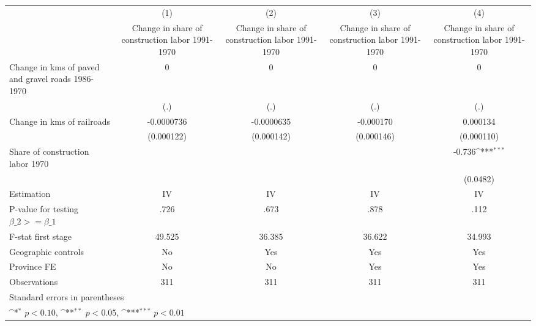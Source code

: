 {
\def\sym#1{\ifmmode^{#1}\else\(^{#1}\)\fi}
\begin{tabular}{l*{4}{c}}
\hline\hline
                    &\multicolumn{1}{c}{(1)}&\multicolumn{1}{c}{(2)}&\multicolumn{1}{c}{(3)}&\multicolumn{1}{c}{(4)}\\
                    &\multicolumn{1}{c}{Change in share of construction labor 1991-1970}&\multicolumn{1}{c}{Change in share of construction labor 1991-1970}&\multicolumn{1}{c}{Change in share of construction labor 1991-1970}&\multicolumn{1}{c}{Change in share of construction labor 1991-1970}\\
\hline
Change in kms of paved and gravel roads 1986-1970&           0         &           0         &           0         &           0         \\
                    &         (.)         &         (.)         &         (.)         &         (.)         \\
[1em]
Change in kms of railroads&  -0.0000736         &  -0.0000635         &   -0.000170         &    0.000134         \\
                    &  (0.000122)         &  (0.000142)         &  (0.000146)         &  (0.000110)         \\
[1em]
Share of construction labor 1970&                     &                     &                     &      -0.736\sym{***}\\
                    &                     &                     &                     &    (0.0482)         \\
\hline
Estimation          &          IV         &          IV         &          IV         &          IV         \\
P-value for testing $\beta\_2 >= \beta\_1$&        .726         &        .673         &        .878         &        .112         \\
F-stat first stage  &      49.525         &      36.385         &      36.622         &      34.993         \\
Geographic controls &          No         &         Yes         &         Yes         &         Yes         \\
Province FE         &          No         &          No         &         Yes         &         Yes         \\
Observations        &         311         &         311         &         311         &         311         \\
\hline\hline
\multicolumn{5}{l}{\footnotesize Standard errors in parentheses}\\
\multicolumn{5}{l}{\footnotesize \sym{*} \(p<0.10\), \sym{**} \(p<0.05\), \sym{***} \(p<0.01\)}\\
\end{tabular}
}
